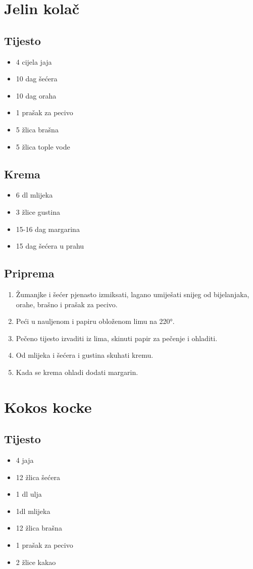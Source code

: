 \documentclass{article}
\begin{document}
\section{Jelin kolač}
\subsection{Tijesto}
\begin{itemize}
  \item 4 cijela jaja
  \item 10 dag šećera
  \item 10 dag oraha
  \item 1 prašak za pecivo
  \item 5 žlica brašna
  \item 5 žlica tople vode
\end{itemize}

\subsection{Krema}
\begin{itemize}
    \item 6 dl mlijeka
    \item 3 žlice gustina 
    \item 15-16 dag margarina 
    \item 15 dag šećera u prahu
\end{itemize}

\subsection{Priprema}
\begin{enumerate}
  \item Žumanjke i šećer pjenasto izmiksati, lagano umiješati snijeg od bijelanjaka, orahe, brašno i prašak za pecivo.
  \item Peći u nauljenom i papiru obloženom limu na 220°.
  \item Pečeno tijesto izvaditi iz lima, skinuti papir za pečenje i ohladiti.
  \item Od mlijeka i šećera i gustina skuhati kremu.
  \item Kada se krema ohladi dodati margarin.
\end{enumerate}

\section{Kokos kocke}
\subsection{Tijesto}
\begin{itemize}
  \item 4 jaja
  \item 12 žlica šećera
  \item 1 dl ulja
  \item 1dl mlijeka
  \item 12 žlica brašna
  \item 1 prašak za pecivo
  \item 2 žlice kakao
\end{itemize}
\end{document}
